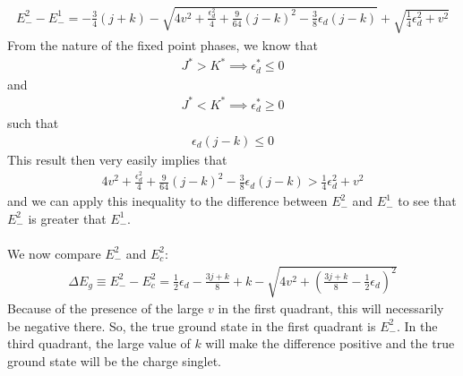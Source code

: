 \documentclass[twoside,11pt]{report}
\numberwithin{equation}{section}
\begin{document}
\begin{equation}\begin{aligned}
	E_-^2 - E_-^1= - \frac{3}{4}\left( j + k \right) - \sqrt{4v^2 + \frac{\epsilon_d^2}{4} + \frac{9}{64}\left( j - k \right) ^2 - \frac{3}{8}\epsilon_d\left( j-k \right) } + \sqrt{ \frac{1}{4}\epsilon_d^2 + v^2}
\end{aligned}\end{equation}
From the nature of the fixed point phases, we know that 
\begin{equation}\begin{aligned}
	J^* > K^* \implies \epsilon_d^* \leq 0
\end{aligned}\end{equation}
and
\begin{equation}\begin{aligned}
	J^* < K^* \implies \epsilon_d^* \geq 0
\end{aligned}\end{equation}
such that
\begin{equation}\begin{aligned}
	\epsilon_d\left( j-k \right) \leq 0
\end{aligned}\end{equation}
This result then very easily implies that
\begin{equation}\begin{aligned}
	4v^2 + \frac{\epsilon_d^2}{4} + \frac{9}{64}\left( j - k \right) ^2 - \frac{3}{8}\epsilon_d\left( j-k \right) > \frac{1}{4}\epsilon_d^2 + v^2
\end{aligned}\end{equation}
and we can apply this inequality to the difference between \(E_-^2\) and \(E_-^1\) to see that \(E_-^2\) is greater that \(E_-^1\).
\\\\We now compare \(E_-^2\) and \(E_c^2\):
\begin{equation}\begin{aligned}
	\Delta E_g \equiv E_-^2 - E_c^2 = \frac{1}{2}\epsilon_d - \frac{3j + k}{8} + k - \sqrt{4v^2 + \left(\frac{3j+k}{8} -\frac{1}{2} \epsilon_d\right) ^2}
\end{aligned}\end{equation}
Because of the presence of the large \(v\) in the first quadrant, this will necessarily be negative there. So, the true ground state in the first quadrant is \(E_-^2\). In the third quadrant, the large value of \(k\) will make the difference positive and the true ground state will be the charge singlet. 
\end{document}
